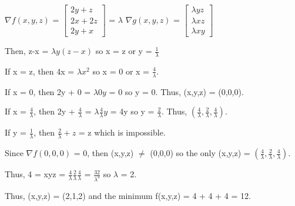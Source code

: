     \begin{tbox}
        $\nabla f(x,y,z)$
        = $\begin{bmatrix}
            2y+z \\
            2x+2z \\
            2y+x
        \end{bmatrix}$
        = $\lambda$ $\nabla g(x,y,z)$
        = $\begin{bmatrix}
            \lambda yz \\
            \lambda xz \\
            \lambda xy
        \end{bmatrix}$

        Then, z-x = $\lambda y(z-x)$ so x = z or y = $\frac{1}{\lambda}$

        \hspace{0.5cm}
        If x = z, then 4x = $\lambda x^2$ so x = 0 or x = $\frac{4}{\lambda}$.

        \hspace{1cm}
        If x = 0, then 2y + 0 = $\lambda 0y$ = 0 so y = 0. Thus, (x,y,z) = (0,0,0).

        \hspace{1cm}
        If x = $\frac{4}{\lambda}$, then
        2y + $\frac{4}{\lambda}$ = $\lambda \frac{4}{\lambda} y$ = 4y
        so y = $\frac{2}{\lambda}$. Thus,
        $(\frac{4}{\lambda},\frac{2}{\lambda},\frac{4}{\lambda})$.

        \hspace{0.5cm}
        If y = $\frac{1}{\lambda}$, then $\frac{2}{\lambda} + z$ = z
        which is impossible.

        Since $\nabla f(0,0,0)$ = 0, then (x,y,z) $\not =$ (0,0,0)
        so the only (x,y,z)
        = $(\frac{4}{\lambda},\frac{2}{\lambda},\frac{4}{\lambda})$.

        Thus, 4 = xyz
        = $\frac{4}{\lambda} \frac{2}{\lambda} \frac{4}{\lambda}$
        = $\frac{32}{\lambda^3}$
        so $\lambda$ = 2.
        
        Thus, (x,y,z) = (2,1,2) and the minimum f(x,y,z) = 4 + 4 + 4 = 12.
    \end{tbox}

    \vspace{0.5cm}




